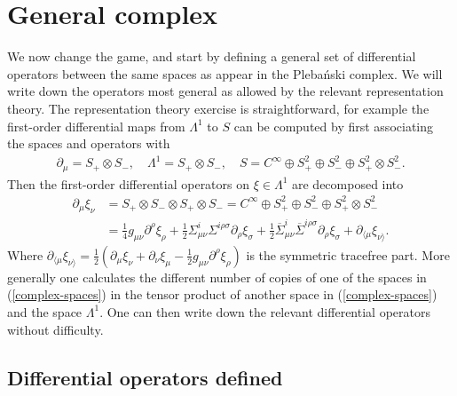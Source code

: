 \documentclass[10pt]{report}
\newcommand{\pleb}[0]{Pleba\'nski}
\theoremstyle{definition}
\newcommand{\asd}[0]{\overline{\Sigma}}
\begin{document}
\section{General complex}

We now change the game, and start by defining a general set of differential operators between the same spaces as appear in the \pleb{} complex. We will write down the operators most general as allowed by the relevant representation theory. The representation theory exercise is straightforward, for example the first-order differential maps from $\Lambda^1$ to $S$ can be computed by first associating the spaces and operators with
\begin{align}
    \partial_\mu = S_+ \otimes S_-, \quad \Lambda^1 = S_+ \otimes S_-, \quad S = C^\infty \oplus S_+^2 \oplus S_-^2 \oplus S_+^2 \otimes S_-^2. 
\end{align}
Then the first-order differential operators on $\xi \in \Lambda^1$ are decomposed into
\begin{align}
    \partial_\mu \xi_\nu &= S_+ \otimes S_- \otimes S_+ \otimes S_- = C^\infty \oplus S_+^2 \oplus S_-^2 \oplus S_+^2 \otimes S^2_-\nonumber \\ &= \frac{1}{4} g_{\mu\nu} \partial^\rho \xi_\rho + \frac{1}{2} \Sigma^i_{\mu\nu} \Sigma^{i\rho\sigma} \partial_\rho \xi_\sigma + \frac{1}{2} \asd^i_{\mu\nu} \asd^{i\rho\sigma} \partial_\rho \xi_\sigma + \partial_{\langle \mu} \xi_{\nu \rangle}.
\end{align}
Where $\partial_{\langle \mu} \xi_{\nu \rangle} = \frac{1}{2} \left( \partial_\mu \xi_\nu + \partial_\nu \xi_\mu - \frac{1}{2} g_{\mu\nu} \partial^\rho \xi_\rho \right)$ is the symmetric tracefree part. More generally one calculates the different number of copies of one of the spaces in (\ref{complex-spaces}) in the tensor product of another space in (\ref{complex-spaces}) and the space $\Lambda^1$. One can then write down the relevant differential operators without difficulty. 

\subsection{Differential operators defined}
\end{document}
